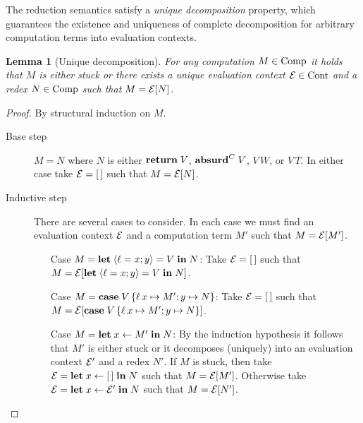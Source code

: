 \documentclass[12pt,phd,lfcs,twoside,openright,logo,leftchapter,normalheadings]{infthesis}
\theoremstyle{plain}
\newtheorem{lemma}[theorem]{Lemma}
\theoremstyle{definition}
\begin{document}
The reduction semantics satisfy a \emph{unique decomposition}
property, which guarantees the existence and uniqueness of complete
decomposition for arbitrary computation terms into evaluation
contexts.
%
\begin{lemma}[Unique decomposition]\label{lem:base-language-uniq-decomp}
  For any computation $M \in \textrm{Comp}$ it holds that $M$ is either
  stuck or there exists a unique evaluation context $\mathcal{E} \in \textrm{Cont}$
  and a redex $N \in \textrm{Comp}$ such that $M = \mathcal{E}[N]$.
\end{lemma}
%
\begin{proof}
  By structural induction on $M$.
  \begin{description}
  \item[Base step] $M = N$ where $N$ is either $\mathbf{return}\;V$,
    $\mathbf{absurd}^C\;V$, $V\,W$, or $V\,T$. In either case take
    $\mathcal{E} = [\,]$ such that $M = \mathcal{E}[N]$.
  \item[Inductive step]
    There are several cases to consider. In each case we must find an
    evaluation context $\mathcal{E}$ and a computation term $M'$ such that
    $M = \mathcal{E}[M']$.
    \begin{itemize}
      \item[Case] $M = \mathbf{let}\;\langle \ell = x; y \rangle = V\;\mathbf{in}\;N$: Take $\mathcal{E} = [\,]$ such that $M = \mathcal{E}[\mathbf{let}\;\langle \ell = x; y \rangle = V\;\mathbf{in}\;N]$.
      \item[Case] $M = \mathbf{case}\;V\,\{\ell\,x \mapsto M'; y \mapsto N\}$:
        Take $\mathcal{E} = [\,]$ such that
        $M = \mathcal{E}[\mathbf{case}\;V\,\{\ell\,x \mapsto M'; y \mapsto N\}]$.
      \item[Case] $M = \mathbf{let}\;x \leftarrow M' \;\mathbf{in}\;N$: By the induction
        hypothesis it follows that $M'$ is either stuck or it
        decomposes (uniquely) into an evaluation context $\mathcal{E}'$ and a
        redex $N'$. If $M$ is stuck, then take
        $\mathcal{E} = \mathbf{let}\;x \leftarrow [\,] \;\mathbf{in}\;N$ such that $M =
        \mathcal{E}[M']$. Otherwise take $\mathcal{E} = \mathbf{let}\;x \leftarrow \mathcal{E}'\;\mathbf{in}\;N$
        such that $M = \mathcal{E}[N']$.
    \end{itemize}
  \end{description}
\end{proof}
\end{document}
